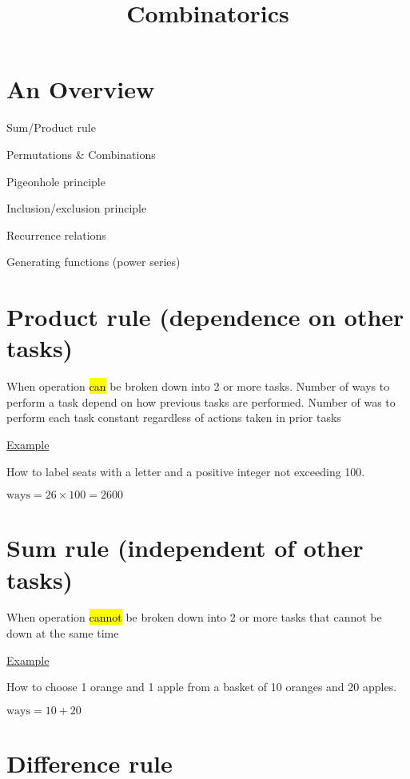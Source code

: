 \documentclass[12pt]{article}
\title{\textbf{Combinatorics}}
\date{}
\begin{document}
\maketitle

\begin{spacing}{1.5}

\section{An Overview}

\begin{itemize*}
	\item Sum/Product rule
	\item Permutations \& Combinations
	\item Pigeonhole principle
	\item Inclusion/exclusion principle
	\item Recurrence relations
	\item Generating functions (power series)
\end{itemize*}

\section{Product rule (dependence on other tasks)}

When operation \hl{can} be broken down into 2 or more tasks. Number of ways to perform a task depend on how previous tasks are performed. Number of was to perform each task constant regardless of actions taken in prior tasks

\underline{Example}

How to label seats with a letter and a positive integer not exceeding 100. 

$\text{ways} = 26 \times 100 = 2600$

\section{Sum rule (independent of other tasks)}

When operation \hl{cannot} be broken down into 2 or more tasks that cannot be down at the same time

\underline{Example}

How to choose 1 orange and 1 apple from a basket of 10 oranges and 20 apples. 

$\text{ways} = 10 + 20$

\section{Difference rule}


\end{spacing}
\end{document}
